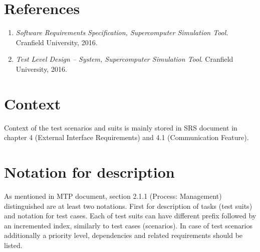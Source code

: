 \section{References} \label{s:introduction:references}
	\begin{comment}
		List all of the applicable reference documents. The references are separated into “external” references
		that are imposed external to the project and “internal” references that are imposed from within to the
		project. This may also be at the end of the document.
	\end{comment}
	\begin{enumerate}
		\item \emph{Software Requirements Specification, Supercomputer Simulation Tool}. Cranfield University, 2016.
		\item \emph{Test Level Design -- System, Supercomputer Simulation Tool}. Cranfield University, 2016.
	\end{enumerate}
\section{Context} \label{s:introduction:context}
	\begin{comment}
		Provide any required context that is not already covered by other sections of this document (e.g., thirdparty
		testing via the Internet).
	\end{comment}
	Context of the test scenarios and suits is mainly stored in \gls{SRS} document in chapter 4 (External Interface Requirements) and 4.1 (Communication Feature). 
\section{Notation for description} \label{s:introduction:notation-for-description}
	\begin{comment}
		Define any numbering schemes, e.g., for scenarios and test cases. The intent of this section is to
		explain any such schema.
	\end{comment}
	As mentioned in \gls{MTP} document, section 2.1.1 (Process: Management) distinguished are at least two notations. First for description of tasks (test suits) and notation for test cases. Each of test suits can have different prefix followed by an incremented index, similarly to test cases (scenarios). In case of test scenarios additionally a priority level, dependencies and related requirements should be listed.
	